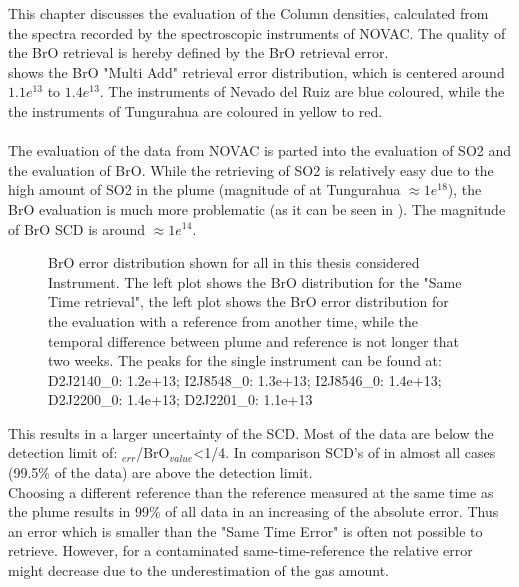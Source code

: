 This chapter discusses the evaluation of the  Column densities, calculated from the spectra recorded by the spectroscopic instruments of NOVAC. The quality of the BrO retrieval is hereby defined by the BrO retrieval error.\\
 shows the BrO "Multi Add" retrieval error distribution, which is centered around $1.1e^{13}$ to $1.4e^{13}$. The instruments of Nevado del Ruiz are blue  coloured, while the the instruments of Tungurahua are coloured in yellow to red.\\
\\
The evaluation of the data from NOVAC is parted into the evaluation of SO2 and the evaluation of BrO. While the retrieving of SO2 is relatively easy due to the high amount of SO2 in the plume (magnitude of  at Tungurahua $\approx 1e^{18}$), the BrO evaluation is much more problematic (as it can be seen in ). The magnitude of BrO SCD is around $\approx 1e^{14}$. \\
%
\begin{figure}
	\caption{BrO error distribution shown for all in this thesis considered Instrument. The left plot shows the BrO distribution for the "Same Time retrieval", the left plot shows the BrO error distribution for the evaluation with a reference from another time, while the temporal difference between plume and reference is not longer that two weeks. 
	The peaks for the single instrument can be found at: D2J2140\_0: 1.2e+13;
		 I2J8548\_0: 1.3e+13;
		I2J8546\_0: 1.4e+13;
		D2J2200\_0: 1.4e+13;
		D2J2201\_0: 1.1e+13}
	\label{fig:allbroerrordistribution}
\end{figure}
%
This results in a larger uncertainty of the   SCD. Most of the   data are below the detection limit of: $_{err}$/BrO$_{value}$<1/4. In comparison SCD's of  in almost all cases (99.5\% of the data)  are above the detection limit. \\
%
Choosing a different reference than the reference measured at the same time as the plume results in 99\% of all data in an increasing of the absolute error. 
Thus an  error which is smaller than the "Same Time Error" is often not  possible to retrieve. 
However, for a contaminated same-time-reference the relative error might decrease due to the underestimation of the gas amount. \\
